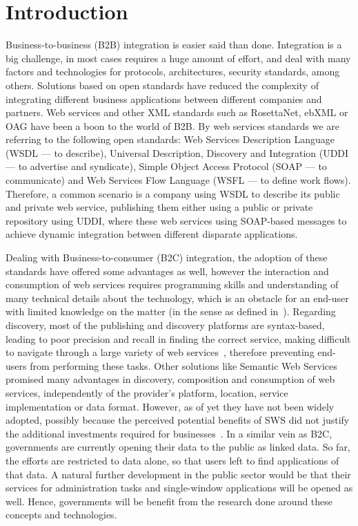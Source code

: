 
\section{Introduction}
\label{sec:introduction}

Business-to-business (B2B) integration is easier said than done. Integration is a big challenge, in most cases requires a huge amount of effort, and deal with many factors and technologies for protocols, architectures, security standards, among others. Solutions based on open standards have reduced the complexity of integrating different business applications between different companies and partners. Web services and other XML standards such as RosettaNet, ebXML or OAG have been a boon to the world of B2B. By web services standards we are referring to the following open standards: Web Services Description Language (WSDL --- to describe), Universal Description, Discovery and Integration (UDDI --- to advertise and syndicate), Simple Object Access Protocol (SOAP --- to communicate) and Web Services Flow Language (WSFL --- to define work flows). Therefore, a common scenario is a company using WSDL to describe its public and private web service, publishing them either using a public or private repository using UDDI, where these web services using SOAP-based messages to achieve dynamic integration between different disparate applications.

Dealing with Business-to-consumer (B2C) integration, the adoption of these standards have offered some advantages as well, however the interaction and consumption of web services requires programming skills and understanding of many technical details about the technology, which is an obstacle for an end-user with limited knowledge on the matter (in the sense as defined in~\cite{fuchsloch2010}). 
Regarding discovery, most of the publishing and discovery platforms are syntax-based, leading to poor precision and recall in finding the correct service, making difficult to navigate through a large variety of web services~\cite{pilioura_acm2009}, 
therefore preventing end-users from performing these tasks. 
Other solutions like Semantic Web Services promised many advantages in discovery, composition and consumption of web services, independently of the provider's platform, location, service implementation or data format. 
However, as of yet they have not been widely adopted, 
possibly because the perceived potential benefits of SWS did not justify the additional investments required for businesses~\cite{shi2007}.
In a similar vein as B2C, governments are currently opening their data to the public as linked data. 
So far, the efforts are restricted to data alone, so that users left to find applications of that data. 
A natural further development in the public sector would be that their services for administration tasks and single-window applications will be opened as well. Hence, governments will be benefit from the research done around these concepts and technologies.

